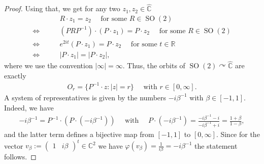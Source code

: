\documentclass{amsart}
\newcommand{\R}{\mathbb{R}}
\newcommand{\C}{\mathbb{C}}
\DeclareMathOperator{\SO}{SO}
\begin{document}
\begin{proof}
    Using that, we get for any two $z_1, z_2 \in \hat{\C}$
    \begin{align*}
         &R \cdot z_1 = z_2 \quad \text{ for some } R \in \SO(2)\\
        \Leftrightarrow \qquad & (P R P^{-1}) \cdot(P \cdot z_1) = P \cdot z_2  \quad \text{ for some } R \in \SO(2) \\
        \Leftrightarrow \qquad & e^{2it} (P \cdot z_1) = P \cdot z_2 \quad \text{ for some } t \in \R\\
        \Leftrightarrow \qquad & |P \cdot z_1| = |P \cdot z_2|,
    \end{align*}
    where we use the convention $|\infty| = \infty$. Thus, the orbits of $\SO(2) \curvearrowright \hat{\C}$ are exactly
    \begin{align*}
        O_r = \{P^{-1} \cdot z: |z| = r\} \quad \text{ with } r \in [0, \infty].
    \end{align*}
    A system of representatives is given by the numbers $-i \beta^{-1}$ with $\beta \in [-1, 1]$. Indeed, we have
    \begin{align*}
        - i \beta^{-1} = P^{-1} \cdot (P \cdot (-i \beta^{-1})) 
        \quad \text{ with } \quad 
        P \cdot (-i \beta^{-1}) = \frac{-i \beta^{-1} - i}{-i \beta^{-1}+i} = \frac{1+\beta}{1-\beta},
    \end{align*}
    and the latter term defines a bijective map from $[-1,1]$ to $[0, \infty]$. Since for the vector $v_\beta := \begin{pmatrix}
        1 & i \beta
    \end{pmatrix}^t \in \C^2$ we have $\varphi(v_\beta) = \frac{1}{i \beta} = - i \beta^{-1}$ the statement follows.


\end{proof}
\end{document}
